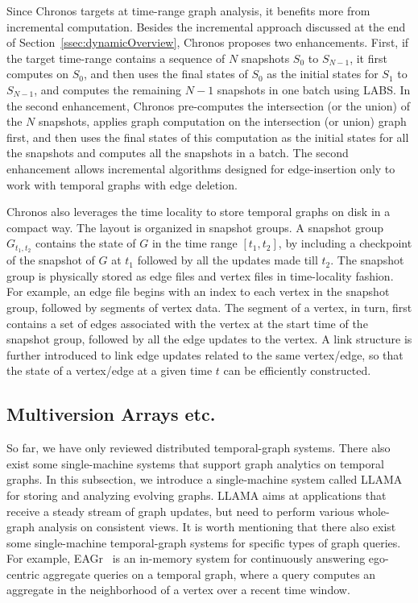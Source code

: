 \documentclass{svjour3}
\begin{document}
\vspace{2mm}

 Since Chronos targets at time-range graph analysis, it benefits more from incremental computation. Besides the incremental approach discussed at the end of Section~\ref{ssec:dynamicOverview}, Chronos proposes two enhancements. First, if the target time-range contains a sequence of $N$ snapshots $S_0$ to $S_{N-1}$, it first computes on $S_0$, and then uses the final states of $S_0$ as the initial states for $S_1$ to $S_{N-1}$, and computes the remaining $N-1$ snapshots in one batch using LABS. In the second enhancement, Chronos pre-computes the intersection (or the union) of the $N$ snapshots, applies graph computation on the intersection (or union) graph first, and then uses the final states of this computation as the initial states for all the snapshots and computes all the snapshots in a batch. The second enhancement allows incremental algorithms designed for edge-insertion only to work with temporal graphs with edge deletion.

\vspace{2mm}

 Chronos also leverages the time locality to store temporal graphs on disk in a compact way. The layout is organized in snapshot groups. A snapshot group $G_{t_1,t_2}$ contains the state of $G$ in the time range $[t_1,t_2]$, by including a checkpoint of the snapshot of $G$ at $t_1$ followed by all the updates made till $t_2$. The snapshot group is physically stored as edge files and vertex files in time-locality fashion. For example, an edge file begins with an index to each vertex in the snapshot group, followed by segments of vertex data. The segment of a vertex, in turn, first contains a set of edges associated with the vertex at the start time of the snapshot group, followed by all the edge updates to the vertex. A link structure is further introduced to link edge updates related to the same vertex/edge, so that the state of a vertex/edge at a given time $t$ can be efficiently constructed.

\subsection{Multiversion Arrays etc.}
So far, we have only reviewed distributed temporal-graph systems. There also exist some single-machine systems that support graph analytics on temporal graphs. In this subsection, we introduce a single-machine system called LLAMA~\cite{llama} for storing and analyzing evolving graphs. LLAMA aims at applications that receive a steady stream of graph updates, but need to perform various whole-graph analysis on consistent views. It is worth mentioning that there also exist some single-machine temporal-graph systems for specific types of graph queries. For example, EAGr~\cite{eagr} is an in-memory system for continuously answering ego-centric aggregate queries on a temporal graph, where a query computes an aggregate in the neighborhood of a vertex over a recent time window.
\end{document}
